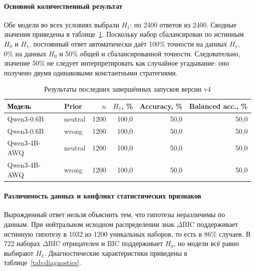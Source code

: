 \documentclass[a4paper,14pt]{extarticle}
\newcommand{\Hnull}{\ensuremath{H_0}}
\newcommand{\Hone}{\ensuremath{H_1}}
\newcommand{\DeltaBIC}{\ensuremath{\Delta\mathrm{BIC}}}
\begin{document}
\paragraph{Основной количественный результат}

Обе модели во всех условиях выбрали \Hone{}: по 2400 ответов из 2400. Сводные значения приведены в таблице~\ref{tab:main-results}. Поскольку набор сбалансирован по истинным \Hnull{} и \Hone, постоянный ответ автоматически даёт 100\% точности на данных \Hone, 0\% на данных \Hnull{} и 50\% общей и сбалансированной точности. Следовательно, значение 50\% не следует интерпретировать как случайное угадывание: оно получено двумя одинаковыми константными стратегиями.

\begin{table}[ht]
  \centering
  \small
  \caption{Результаты последних завершённых запусков версии v4}
  \label{tab:main-results}
  \begin{tabularx}{\textwidth}{>{\raggedright\arraybackslash}X >{\raggedright\arraybackslash}p{} r r r r}
    \toprule
    \textbf{Модель} & \textbf{Prior} & \textbf{$n$} & \textbf{\Hone, \%} & \textbf{Accuracy, \%} & \textbf{Balanced acc., \%} \\
    \midrule
    Qwen3-0.6B & neutral & 1200 & 100,0 & 50,0 & 50,0 \\
    Qwen3-0.6B & wrong   & 1200 & 100,0 & 50,0 & 50,0 \\
    Qwen3-4B-AWQ & neutral & 1200 & 100,0 & 50,0 & 50,0 \\
    Qwen3-4B-AWQ & wrong   & 1200 & 100,0 & 50,0 & 50,0 \\
    \bottomrule
  \end{tabularx}
\end{table}

\paragraph{Различимость данных и конфликт статистических признаков}

Вырожденный ответ нельзя объяснить тем, что гипотезы неразличимы по данным. При нейтральном исходном распределении знак \DeltaBIC{} поддерживает истинную гипотезу в 1032 из 1200 уникальных наборов, то есть в 86\% случаев. В 722 наборах \DeltaBIC{} отрицателен и BIC поддерживает \Hnull, но модели всё равно выбирают \Hone. Диагностические характеристики приведены в таблице~\ref{tab:diagnostics}.
\end{document}
